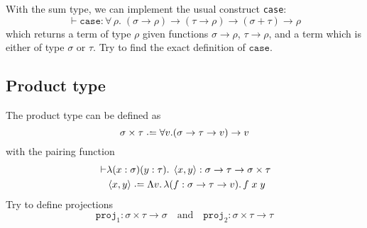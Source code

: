 With the sum type, we can implement the usual construct \texttt{case}:
\[
  \vdash \mathtt{case} : \forall\,\rho.\;(\sigma \to \rho) \to (\tau \to \rho)
  \to (\sigma + \tau) \to \rho
\]
which returns a term of type $\rho$ given functions $\sigma \to \rho$, $\tau \to
\rho$, and a term which is either of type $\sigma$ or $\tau$. Try to find the
exact definition of $\mathtt{case}$.
\subsection{Product type}
The product type can be defined as
\[
  \sigma \times \tau \defeq \forall v. (\sigma \to \tau \to v) \to v
\]
with the pairing function
\begin{align*}
  {} \vdash & \lambda (x : \sigma)(y : \tau).\; \left< x, y\right> :
  \sigma \to \tau \to \sigma
  \times \tau \\
  & \left< x, y\right> \defeq \Lambda v.\,\lambda (f : \sigma \to \tau \to v).\,
  f\;x\;y
\end{align*}
Try to define projections 
\[
  \mathtt{proj}_1 : \sigma \times \tau \to \sigma
  \quad\text{and}\quad
  \mathtt{proj}_2 : \sigma\times \tau \to \tau
\]
